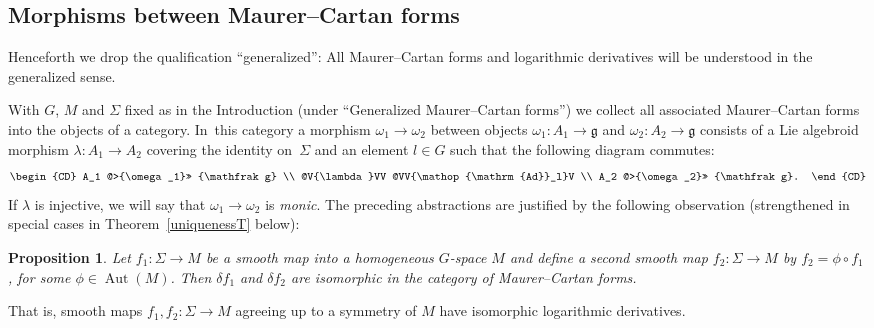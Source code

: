 \documentclass[10pt,a4paper]{amsart}
\numberwithin{equation}{section}
\newtheorem{Proposition}[Theorem]{Proposition}
\DeclareMathOperator{\Adjoint}{Ad}
\DeclareMathOperator{\automorphism}{Aut}
\begin{document}
\subsection*{Morphisms between Maurer--Cartan forms}

Henceforth we drop the qualification ``generalized'': All Maurer--Cartan
forms and logarithmic derivatives will be understood in the
generalized sense.

With $G$, $M$ and $\Sigma $ fixed as in the Introduction (under
``Generalized Maurer--Cartan forms'') we collect all associated
Maurer--Cartan forms into the objects of a category. In~this category a
morphism $\omega_1 \rightarrow \omega_2$ between objects
$\omega_1 \colon A_1 \rightarrow {\mathfrak g} $ and
$\omega_2 \colon A_2 \rightarrow {\mathfrak g} $ consists of a Lie
algebroid morphism $\lambda \colon A_1 \rightarrow A_2$ covering the
identity on~$\Sigma $ and an element $l \in G$ such that the following
diagram commutes:
 \begin{equation*}
 \begin{CD} A_1 @>{\omega_1}>> {\mathfrak g} \\ @V{\lambda}VV
@VV{\Adjoint_l}V \\ A_2 @>{\omega_2}>> {\mathfrak g}.
 \end{CD}
 \end{equation*} If $\lambda$ is injective, we will say that $\omega_1
\rightarrow \omega_2$ is {\it monic}. The preceding abstractions are
justified by the following observation (strengthened in special cases
in Theorem~\ref{uniquenessT} below):

\begin{Proposition}\label{morphismsP}
 Let $f_1\colon \Sigma \rightarrow M$ be a smooth map into a
 homogeneous $G$-space $M$ and define a second smooth map
 $f_2 \colon \Sigma \rightarrow M$ by $f_2 = \phi\circ f_1$, for
 some $\phi \in \automorphism(M)$. Then $\delta f_1$ and $\delta f_2$
 are isomorphic in the category of Maurer--Cartan forms.
\end{Proposition}

That is, smooth maps $f_1,f_2 \colon \Sigma \rightarrow M$ agreeing up
to a symmetry of $M$ have isomorphic logarithmic derivatives.
\end{document}
